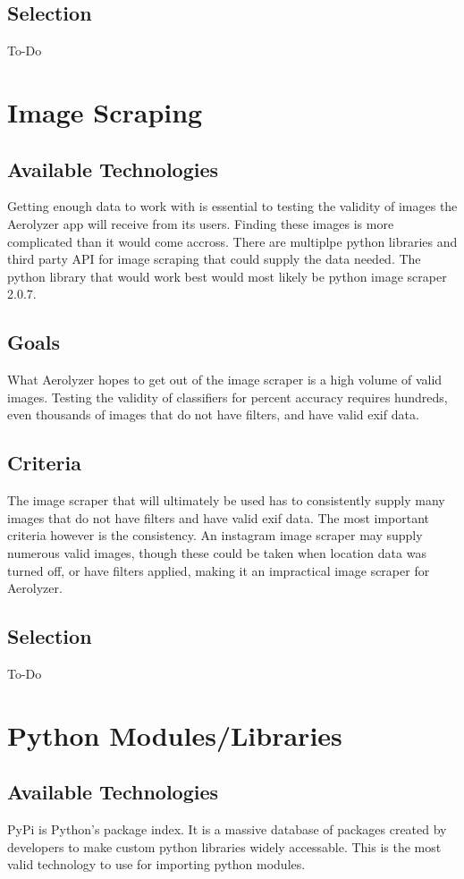 \documentclass[onecolumn, draftclsnofoot,10pt, compsoc]{IEEEtran}
\begin{document}
\begin{flushleft}
\subsection{Selection}
To-Do


\section{Image Scraping}
\subsection{Available Technologies}
Getting enough data to work with is essential to testing the validity of images the Aerolyzer app will receive from its users. Finding these images is more complicated than it would come accross. There are multiplpe python libraries and third party API for image scraping that could supply the data needed. The python library that would work best would most likely be python image scraper 2.0.7.

\subsection{Goals}
What Aerolyzer hopes to get out of the image scraper is a high volume of valid images. Testing the validity of classifiers for percent accuracy requires hundreds, even thousands of images that do not have filters, and have valid exif data. 

\subsection{Criteria}
The image scraper that will ultimately be used has to consistently supply many images that do not have filters and have valid exif data. The most important criteria however is the consistency. An instagram image scraper may supply numerous valid images, though these could be taken when location data was turned off, or have filters applied, making it an impractical image scraper for Aerolyzer.



\subsection{Selection}
To-Do


\section{Python Modules/Libraries}
\subsection{Available Technologies}
PyPi is Python's package index. It is a massive database of packages created by developers to make custom python libraries widely accessable. This is the most valid technology to use for importing python modules.


\end{flushleft}
\end{document}
